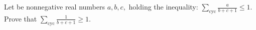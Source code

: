 Let be nonnegative real numbers $ a,b,c, $ holding the inequality: $ \sum_{\text{cyc}} \frac{a}{b+c+1} \le 1. $
Prove that $ \sum_{\text{cyc}} \frac{1}{b+c+1} \ge 1. $